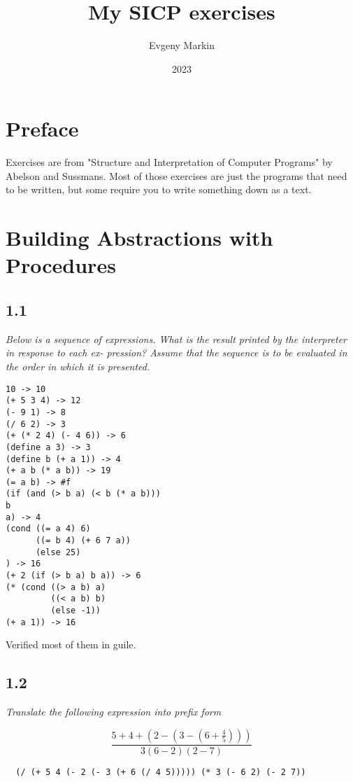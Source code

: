 \documentclass[11pt,oneside,titlepage]{book}
\title{My SICP exercises}
\author{Evgeny Markin}
\date{2023}
\begin{document}
\maketitle
\tableofcontents

\chapter*{Preface}

Exercises are from "Structure and Interpretation of Computer Programs"
by Abelson and Sussmans. Most of those exercises are just the programs
that need to be written, but some require you to write something down
as a text.


\chapter{Building Abstractions with Procedures}

\section*{1.1}

\textit{Below is a sequence of expressions. What is
the result printed by the interpreter in response to each ex-
pression? Assume that the sequence is to be evaluated in
the order in which it is presented.}

\begin{verbatim}
10 -> 10
(+ 5 3 4) -> 12
(- 9 1) -> 8
(/ 6 2) -> 3
(+ (* 2 4) (- 4 6)) -> 6
(define a 3) -> 3
(define b (+ a 1)) -> 4
(+ a b (* a b)) -> 19
(= a b) -> #f
(if (and (> b a) (< b (* a b)))
b
a) -> 4
(cond ((= a 4) 6)
      ((= b 4) (+ 6 7 a))
      (else 25)
) -> 16
(+ 2 (if (> b a) b a)) -> 6
(* (cond ((> a b) a)
         ((< a b) b)
         (else -1))
(+ a 1)) -> 16
\end{verbatim}

Verified most of them in guile.

\section*{1.2}

\textit{Translate the following expression into prefix form}

$$\frac{5 + 4 + (2 - (3 - (6 + \frac{4}{5})))}{3(6 - 2)(2 - 7)}$$

\begin{verbatim}
  (/ (+ 5 4 (- 2 (- 3 (+ 6 (/ 4 5))))) (* 3 (- 6 2) (- 2 7))
\end{verbatim}
\end{document}
